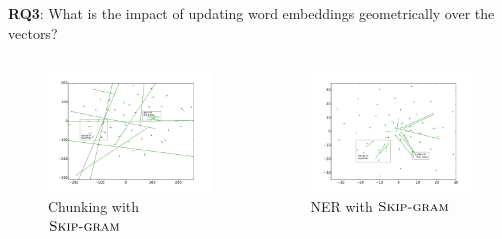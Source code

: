 \documentclass{beamer}
\newcommand{\method}[2][]{\ensuremath{\textsc{#2#1}}\xspace}
\newcommand{\Skipgram}[1][]{\method[#1]{Skip-gram}}
\newcommand{\task}[1]{\textsf{#1}\xspace}
\newcommand{\chunking}{\task{Chunking}}
\newcommand{\ner}{\task{NER}}
\begin{document}
\begin{frame}
\frametitle{}

\textbf{RQ3}: What is the impact of updating word embeddings geometrically over the vectors?

\begin{columns}	
	  \begin{figure}
	   \includegraphics[width=\textwidth]{../plots/vectorField/Lizhen/scaled/Lizhen_skip_chunking}
	   \caption{\chunking with \Skipgram}
	   \end{figure}
	  \begin{figure}
	   \includegraphics[width=\textwidth]{../plots/vectorField/Lizhen/Lizhen_skip_NER}    
   	    \caption{\ner with \Skipgram}
	   \end{figure}	    	
\end{columns}
\end{frame}
\end{document}
